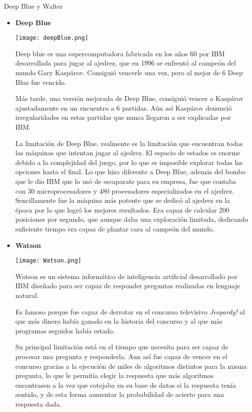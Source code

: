 \documentclass[spanish, a4paper, 12pt]{article} 	%
\begin{document}
\begin{section}{Deep Blue y Walter}
	\begin{itemize}
		\item{\textbf{Deep Blue}}
		
		\begin{center}
		\texttt{[image: deepBlue.png]}
		\end{center}
		
		 Deep blue es una supercomputadora fabricada en los años 60 por IBM desarrollada para jugar al ajedrez, que en 1996 se enfrentó al campeón del mundo Gary Kaspárov. Consiguió vencerle una vez, pero al mejor de 6 Deep Blue fue vencido.
	
		Más tarde, una versión mejorada de Deep Blue, consiguió vencer a Kaspárov ajustadamente en un encuentro a 6 partidas. Aún así Kaspárov denunció irregularidades en estas partidas que nunca llegaron a ser explicadas por IBM. 

		La limitación de Deep Blue, realmente es la limitación que encuentran todas las máquinas que intentan jugar al ajedrez. El espacio de estados es enorme debido a la complejidad del juego, por lo que es imposible explorar todas las opciones hasta el final. Lo que hizo diferente a Deep Blue, además del bombo que le dio IBM que lo usó de escaparate para su empresa, fue que contaba con 30  microprocesadores y 480 procesadores especializados en el ajedrez. Sencillamente fue la máquina más potente que se dedicó al ajedrez en la época por lo que logró los mejores resultados. Era capaz de calcular 200 posiciones por segundo, que aunque daba una exploración limitada, dedicando suficiente tiempo era capaz de plantar cara al campeón del mundo.
	
	\newpage
	\item{\textbf{Watson}}
	
		\begin{center}
		\texttt{[image: Watson.png]}
		\end{center}
	
		Watson es un sistema informático de inteligencia artificial desarrollado por IBM diseñado para ser capaz de responder preguntas realizadas en lenguaje natural.
	
		Es famoso porque fue capaz de derrotar en el concurso televisivo \textit{Jeopardy!} al que más dinero había ganado en la historia del concurso y al que más programas seguidos había estado.
	
		Su principal limitación está en el tiempo que necesita para ser capaz de procesar una pregunta y responderla. Aun así fue capaz de vencer en el concurso gracias a la ejecución de miles de algoritmos distintos para la misma pregunta, lo que le permitía elegir la respuesta que más algoritmos encontrasen a la vez que cotejaba en su base de datos si la respuesta tenía sentido, y de esta forma aumentar la probabilidad de acierto para una respuesta dada. 
		
	\end{itemize}
\end{section}
\end{document}
